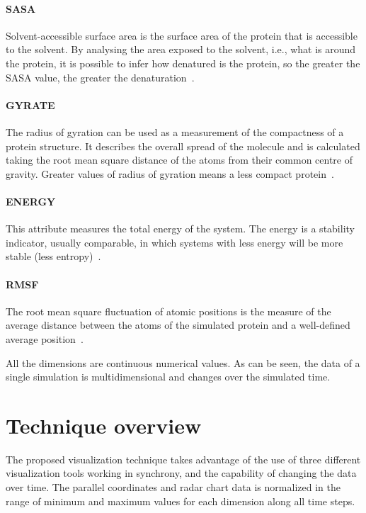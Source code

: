 \documentclass[10pt, conference]{IEEEtran}
\begin{document}
\paragraph*{SASA} Solvent-accessible surface area is the surface area of the protein that is accessible to the solvent. By analysing the area exposed to the solvent, i.e., what is around the protein, it is possible to infer how denatured is the protein, so the greater the SASA value, the greater the denaturation~\cite{richmond1984solvent}.
%

\paragraph*{GYRATE} The radius of gyration can be used as a measurement of the compactness of a protein structure. It describes the overall spread of the molecule and is calculated taking the root mean square distance of the atoms from their common centre of gravity. Greater values of radius of gyration means a less compact protein~\cite{lobanov2008radius}.
%

\paragraph*{ENERGY} This attribute measures the total energy of the system. The energy is a stability indicator, usually comparable, in which systems with less energy will be more stable (less entropy)~\cite{van1998gromos}.
%

\paragraph*{RMSF} The root mean square fluctuation of atomic positions is the measure of the average distance between the atoms of the simulated protein and a well-defined average position~\cite{maiorov1994significance}. 
%

All the dimensions are continuous numerical values. As can be seen, the data of a single simulation is multidimensional and changes over the simulated time.

\section{Technique overview}
%

The proposed visualization technique takes advantage of the use of three different visualization tools working in synchrony, and the capability of changing the data over time. The parallel coordinates and radar chart data is normalized in the range of minimum and maximum values for each dimension along all time steps.
\end{document}

